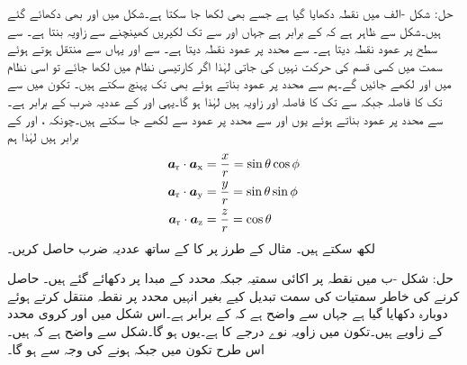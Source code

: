 حل: شکل -الف میں نقطہ  دکھایا گیا ہے جسے  بھی لکھا جا سکتا ہے۔شکل میں  اور  بھی دکھائے گئے ہیں۔شکل سے ظاہر ہے کہ  کے برابر ہے جہاں  اور  سے  تک لکیریں کھینچنے سے زاویہ  بنتا ہے۔ سے  سطح پر عمود نقطہ  دیتا ہے۔ سے  محدد پر عمود نقطہ  دیتا ہے۔ سے  اور یہاں سے  منتقل ہوتے ہوئے  سمت میں کسی قسم کی حرکت نہیں کی جاتی لہٰذا اگر کارتیسی نظام میں  لکھا جائے تو اسی نظام میں  اور   لکھے جائیں گے۔ہم  سے  محدد پر عمود بناتے ہوئے بھی  تک پہنچ سکتے ہیں۔ تکون  میں  سے  تک کا فاصلہ  جبکہ  سے  تک کا فاصلہ  اور زاویہ  ہیں لہٰذا  ہو گا۔یہی   اور  کے عددیہ ضرب  کے برابر ہے۔ سے  محدد پر عمود بناتے ہوئے یوں  اور  سے  محدد پر عمود سے  لکھے جا سکتے ہیں۔چونکہ ،  اور  کے برابر  ہیں لہٰذا ہم
\begin{align*}
{\boldsymbol{a}}_{\textup{r}} \cdot {\boldsymbol{a}}_{\textup{x}}&=\frac{x}{r}=\sin \theta \cos \phi\\
{\boldsymbol{a}}_{\textup{r}} \cdot {\boldsymbol{a}}_{\textup{y}}&=\frac{y}{r}=\sin \theta \sin \phi\\
{\boldsymbol{a}}_{\textup{r}} \cdot {\boldsymbol{a}}_{\textup{z}}&=\frac{z}{r}=\cos \theta
\end{align*}
لکھ سکتے ہیں۔
مثال  کے طرز پر   کا  کے ساتھ عددیہ ضرب حاصل کریں۔

حل: شکل -ب میں نقطہ  پر اکائی سمتیہ  جبکہ محدد کے مبدا  پر  دکھائے گئے ہیں۔ حاصل کرنے کی خاطر سمتیات کی سمت تبدیل کیے بغیر انہیں  محدد پر نقطہ  منتقل کرتے ہوئے دوبارہ دکھایا گیا ہے جہاں سے واضح ہے کہ  کے برابر ہے۔اس شکل میں  اور  کروی محدد کے زاویے ہیں۔تکون  میں زاویہ  نوے درجے کا ہے۔یوں  ہو گا۔شکل سے واضح ہے کہ   ہیں۔اس طرح تکون  میں  جبکہ  ہونے کی وجہ سے  ہو گا۔

